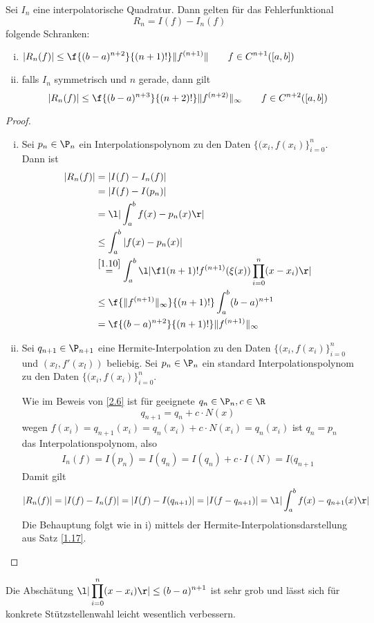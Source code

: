 \documentclass[11pt]{scrbook}
\begin{document}
\begin{st}
	\label{2.7}
	Sei $I_n$ eine interpolatorische Quadratur.
	Dann gelten für das Fehlerfunktional
	\[
		R_n = I(f) - I_n(f)
	\]
	folgende Schranken:
	\begin{enumerate}[i)]
		\item
			$\displaystyle |R_n(f)| \le \f {(b-a)^{n+2}}{(n+1)!}\|f^{(n+1)}\| \qquad f\in C^{n+1}([a,b])$
		\item
			falls $I_n$ symmetrisch und $n$ gerade, dann gilt
			\[
				|R_n(f)| \le \f {(b-a)^{n+3}}{(n+2)!} \|f^{(n+2)}\|_\infty \qquad f\in C^{n+2}([a,b])
			\]
	\end{enumerate}
	\begin{proof}
		\begin{enumerate}[i)]
			\item
				Sei $p_n\in \P_n$ ein Interpolationspolynom zu den Daten $\{(x_i,f(x_i)\}_{i=0}^n$.
				Dann ist
				\begin{align*}
					|R_n(f)| 
					&= |I(f) - I_n(f)| \\
					&= |I(f) - I(p_n)| \\
					&= \l|\int_a^b f(x) - p_n(x) \r| \\
					&\le \int_a^b |f(x)-p_n(x)| \\
					&\stackrel{\ref{1.10}}= \int_a^b \l| \f 1{(n+1)!}f^{(n+1)}(\xi(x)) \prod_{i=0}^n (x-x_i)\r| \\
					&\le \f {\|f^{(n+1)}\|_\infty}{(n+1)!} \int_a^b (b-a)^{n+1} \\
					&= \f {(b-a)^{n+2}}{(n+1)!}\|f^{(n+1)}\|_\infty
				\end{align*}
			\item
				Sei $q_{n+1}\in \P_{n+1}$ eine Hermite-Interpolation zu den Daten $\{(x_i,f(x_i)\}_{i=0}^n$ und $(x_l,f'(x_l))$ beliebig.
				Sei $p_n\in \P_n$ ein standard Interpolationspolynom zu den Daten $\{(x_i,f(x_i)\}_{i=0}^n$.

				Wie im Beweis von \ref{2.6}	ist für geeignete $q_n\in \P_n, c\in \R$ 
				\[
					q_{n+1} = q_n + c\cdot N(x)
				\]
				wegen $f(x_i) = q_{n+1}(x_i) = q_n(x_i) + c\cdot N(x_i) = q_n(x_i)$ ist $q_n = p_n$ das Interpolationspolynom, also
				\begin{align*}
					I_n(f)
					= I(p_n)
					= I(q_n)
					= I(q_n) + c\cdot I(N)
					= I(q_{n+1}
				\end{align*}
				Damit gilt
				\[
					|R_n(f)| 
					= |I(f) - I_n(f)| 
					= |I(f) - I(q_{n+1})|
					= |I(f-q_{n+1})|
					= \l| \int_a^b f(x) - q_{n+1}(x) \r|
				\]
				Die Behauptung folgt wie in i) mittels der Hermite-Interpolationsdarstellung aus Satz \ref{1.17}.
		\end{enumerate}
	\end{proof}
	\begin{note}
		Die Abschätung $\displaystyle \l| \prod_{i=0}^n (x-x_i) \r| \le (b-a)^{n+1}$ ist sehr grob und lässt sich für konkrete Stützstellenwahl leicht wesentlich verbessern.
	\end{note}
\end{st}
\end{document}
